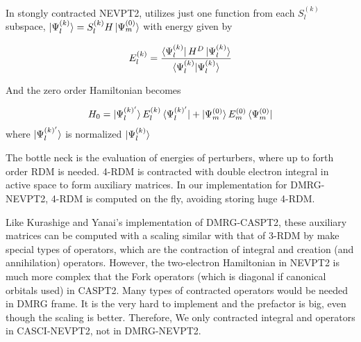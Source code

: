 In stongly contracted NEVPT2, utilizes just one function from each $S_l^{(k)}$ subspace, $\ket{\Psi^{(k)}_l} = S^{(k)}_l H \ket{\Psi^{(0)}_m}$ with energy given by

\begin{equation}
  E^{(k)}_l = \frac{\bra{\Psi^{(k)}_l}H^D\ket{\Psi^{(k)}_l}}{\braket{\Psi^{(k)}_l|\Psi^{(k)}_l}}
\end{equation}

And the zero order Hamiltonian becomes

\begin{equation}
  H_0 = \ket{\Psi^{(k)'}_l}E^{(k)}_l \bra{\Psi^{(k)'}_l} +\ket{\Psi^{(0)}_m}E^{(0)}_m \bra{\Psi^{(0)}_m}
\end{equation}
where $\ket{\Psi^{(k)'}_l}$ is normalized $\ket{\Psi^{(k)}_l}$


The bottle neck is the evaluation of energies of perturbers, where up to forth order RDM is needed. 4-RDM is contracted with double electron integral in active space to form auxiliary matrices. \cite{ angeli_n-electron_2002} In our implementation for DMRG-NEVPT2, 4-RDM is computed on the fly, avoiding storing huge 4-RDM.


Like Kurashige and Yanai's implementation of DMRG-CASPT2\cite{kurashige_second-order_2011}, these auxiliary matrices can be computed with a scaling similar with that of 3-RDM by make special types of operators, which are the contraction of integral and creation (and annihilation) operators. However, the two-electron Hamiltonian in NEVPT2 is much more complex that the Fork operators (which is diagonal if canonical orbitals used) in CASPT2. Many types of contracted operators would be needed in DMRG frame. It is the very hard to implement and the prefactor is big, even though the scaling is better. Therefore, We only contracted integral and operators in CASCI-NEVPT2, not in DMRG-NEVPT2.




